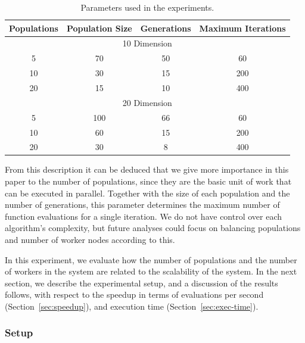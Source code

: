 \documentclass[review]{elsarticle}
\begin{document}
\begin{table}[h!tbp]
  \small
  \caption{Parameters used in the experiments.
  }
  \label{tab:params:10}
  \vspace{0.25cm}
  \centering
  \small
  \begin{tabular}{|c|c|c|c|}
    \hline
      Populations & Population Size & Generations & Maximum Iterations  \\ \hline
                 \multicolumn{4}{|c|}{10 Dimension } \\ \hline
         5        &  70             &        50   &   60                \\ \hline
         10       &  30             &        15   &   200                \\ \hline
         20       &  15             &        10   &   400                \\ \hline
                  \multicolumn{4}{|c|}{20 Dimension } \\ \hline
         5        &  100            &        66   &   60                \\ \hline
         10       &  60             &        15   &   200                \\ \hline
         20       &  30             &        8   &    400                \\ \hline
  
  \end{tabular}
\end{table}

From this description it can be deduced that we give more importance in this
paper to the number of populations, since they are the basic unit of work that
can be executed in parallel. Together with the size of each population and the
number of generations, this parameter determines the maximum number of function
evaluations for a single iteration. We do not have control over each algorithm's
complexity, but future analyses could focus on balancing populations and number
of worker nodes according to this.

In this experiment, we evaluate how the number of populations and the number of
workers in the system are related to the scalability of the system. 
In the next section, we describe the experimental setup, and a discussion of the results
follows, with respect to the speedup in terms of evaluations per second (Section~\ref{sec:speedup}), and 
execution time (Section~\ref{sec:exec-time}).

\subsubsection{Setup} %
\end{document}
